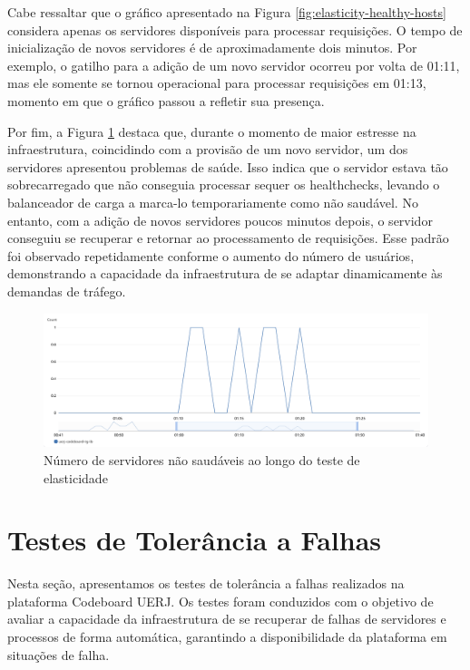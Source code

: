 Cabe ressaltar que o gráfico apresentado na Figura \ref{fig:elasticity-healthy-hosts} considera apenas os servidores disponíveis para processar requisições. O tempo de inicialização de novos servidores é de aproximadamente dois minutos. Por exemplo, o gatilho para a adição de um novo servidor ocorreu por volta de 01:11, mas ele somente se tornou operacional para processar requisições em 01:13, momento em que o gráfico passou a refletir sua presença.

Por fim, a Figura \ref{fig:elasticity-unhealthy-hosts} destaca que, durante o momento de maior estresse na infraestrutura, coincidindo com a provisão de um novo servidor, um dos servidores apresentou problemas de saúde. Isso indica que o servidor estava tão sobrecarregado que não conseguia processar sequer os healthchecks, levando o balanceador de carga a marca-lo temporariamente como não saudável. No entanto, com a adição de novos servidores poucos minutos depois, o servidor conseguiu se recuperar e retornar ao processamento de requisições. Esse padrão foi observado repetidamente conforme o aumento do número de usuários, demonstrando a capacidade da infraestrutura de se adaptar dinamicamente às demandas de tráfego.

\begin{figure}[H]
    \centering
    \includegraphics[width=1\textwidth]{assets/elasticity-test/unhealthy-hosts.png}
    \caption{Número de servidores não saudáveis ao longo do teste de elasticidade}
    \label{fig:elasticity-unhealthy-hosts}
\end{figure}


\section{Testes de Tolerância a Falhas}

Nesta seção, apresentamos os testes de tolerância a falhas realizados na plataforma Codeboard UERJ. Os testes foram conduzidos com o objetivo de avaliar a capacidade da infraestrutura de se recuperar de falhas de servidores e processos de forma automática, garantindo a disponibilidade da plataforma em situações de falha.


